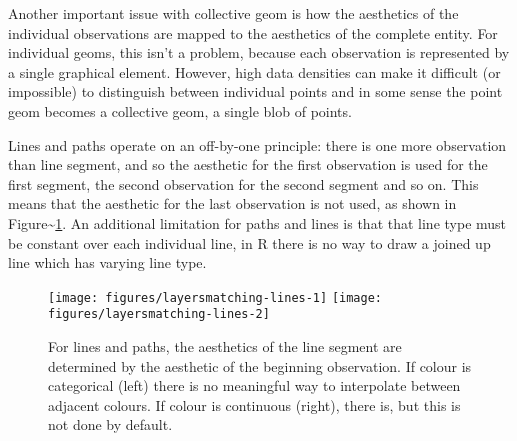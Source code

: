 Another important issue with collective geom is how the aesthetics of
the individual observations are mapped to the aesthetics of the complete
entity. For individual geoms, this isn't a problem, because each
observation is represented by a single graphical element. However, high
data densities can make it difficult (or impossible) to distinguish
between individual points and in some sense the point geom becomes a
collective geom, a single blob of points.

Lines and paths operate on an off-by-one principle: there is one more
observation than line segment, and so the aesthetic for the first
observation is used for the first segment, the second observation for
the second segment and so on. This means that the aesthetic for the last
observation is not used, as shown in
Figure\textasciitilde{}\ref{fig:matching-lines}. An additional
limitation for paths and lines is that that line type must be constant
over each individual line, in R there is no way to draw a joined up line
which has varying line type.  

\begin{Shaded}
\begin{Highlighting}[]
\StringTok{ }\NormalTok{(} \NormalTok{:}\NormalTok{, } \NormalTok{:}\NormalTok{, } \NormalTok{(}\NormalTok{,}\NormalTok{,}\NormalTok{))}
 \NormalTok{(}\NormalTok{)) +}\StringTok{ }
\StringTok{  }\NormalTok{(}\NormalTok{(} \NormalTok{), } \NormalTok{)}
 \NormalTok{(}\NormalTok{)) +}\StringTok{ }\NormalTok{(} \NormalTok{)}
\end{Highlighting}
\end{Shaded}

\begin{figure}
\texttt{[image: figures/layersmatching-lines-1]} \texttt{[image: figures/layersmatching-lines-2]} \caption{For lines and paths, the aesthetics of the line segment are determined by the aesthetic of the beginning observation. If colour is categorical (left) there is no meaningful way to interpolate between adjacent colours. If colour is continuous (right), there is, but this is not done by default.\label{fig:matching-lines}}
\end{figure}

